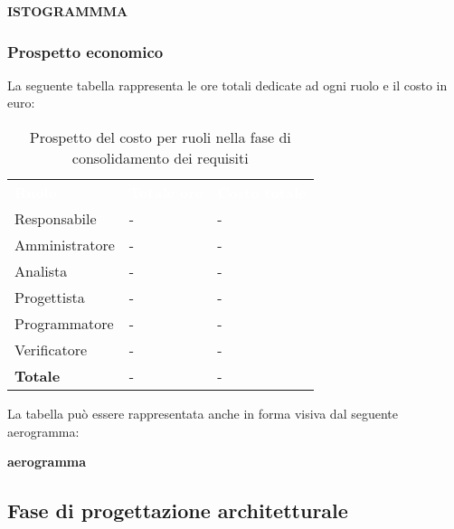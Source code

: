 \textbf{ISTOGRAMMMA}

\subsubsection{Prospetto economico}
La seguente tabella rappresenta le ore totali dedicate ad ogni ruolo e il costo in euro:

\begin{table}[!htbp]
\begin{center}
\renewcommand{\arraystretch}{1.5}
\begin{tabular}{ m{}<{\centering}  m{}<{\centering} m{}<{\centering}}
	\rowcolor{darkblue}
	\textcolor{white}{\textbf{Ruolo}}&\textcolor{white}{\textbf{Totale ore}}&\textcolor{white}{\textbf{Costo totale}}\\ 

	Responsabile  & - & - \\	

	Amministratore & - & - \\
	
	Analista & - & - \\
	
	Progettista & - & - \\
	
	Programmatore & - & - \\
	
 	Verificatore & - & - \\
	
	\textbf{Totale} & - & - \\
	
\end{tabular}
\caption{Prospetto del costo per ruoli nella fase di consolidamento dei requisiti}
\end{center}
\end{table}

La tabella può essere rappresentata anche in forma visiva dal seguente aerogramma:

\textbf{aerogramma}



\subsection{Fase di progettazione architetturale}
